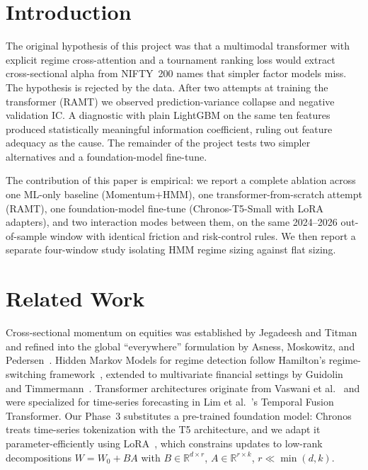 \documentclass[conference]{IEEEtran}
\begin{document}
\section{Introduction}
The original hypothesis of this project was that a multimodal transformer with
explicit regime cross-attention and a tournament ranking loss would extract
cross-sectional alpha from NIFTY~200 names that simpler factor models miss. The
hypothesis is rejected by the data. After two attempts at training the
transformer (RAMT) we observed prediction-variance collapse and negative
validation IC. A diagnostic with plain LightGBM on the same ten features
produced statistically meaningful information coefficient, ruling out feature
adequacy as the cause. The remainder of the project tests two simpler
alternatives and a foundation-model fine-tune.

The contribution of this paper is empirical: we report a complete ablation
across one ML-only baseline (Momentum$+$HMM), one transformer-from-scratch
attempt (RAMT), one foundation-model fine-tune (Chronos-T5-Small with LoRA
adapters), and two interaction modes between them, on the same 2024--2026
out-of-sample window with identical friction and risk-control rules. We then
report a separate four-window study isolating HMM regime sizing against flat
sizing.

\section{Related Work}
Cross-sectional momentum on equities was established by Jegadeesh and
Titman~\cite{jegadeesh1993} and refined into the global ``everywhere''
formulation by Asness, Moskowitz, and Pedersen~\cite{asness2013}. Hidden Markov
Models for regime detection follow Hamilton's regime-switching framework~\cite{hamilton1989},
extended to multivariate financial settings by Guidolin and
Timmermann~\cite{guidolin2007}. Transformer architectures originate from
Vaswani et al.~\cite{vaswani2017} and were specialized for time-series
forecasting in Lim et al.~\cite{lim2021}'s Temporal Fusion Transformer. Our
Phase~3 substitutes a pre-trained foundation model: Chronos~\cite{chronos2023}
treats time-series tokenization with the T5 architecture, and we adapt it
parameter-efficiently using LoRA~\cite{lora2021}, which constrains updates
to low-rank decompositions $W = W_0 + BA$ with $B \in \mathbb{R}^{d \times r}$,
$A \in \mathbb{R}^{r \times k}$, $r \ll \min(d,k)$.
\end{document}
